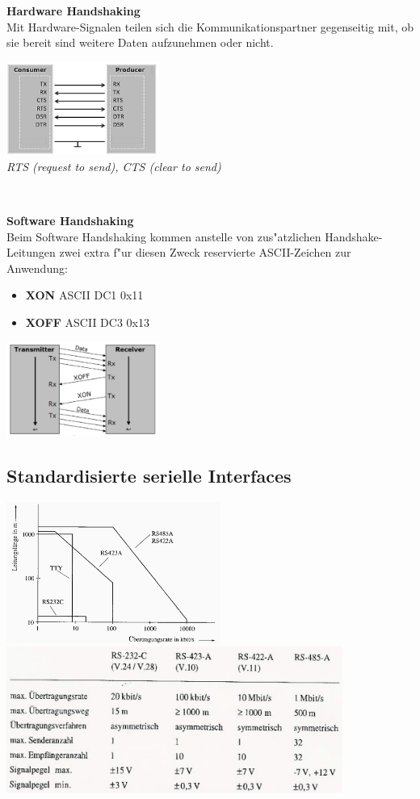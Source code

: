 	\begin{minipage}[t]{9cm}
		\textbf{Hardware Handshaking}\\
		Mit Hardware-Signalen teilen sich die Kommunikationspartner gegenseitig mit, ob sie bereit sind weitere Daten aufzunehmen oder nicht.
		\begin{center}
			\includegraphics[width=5cm]{images/HW-handshake}\\
			\textit{RTS (request to send), CTS (clear to send)}
		\end{center}
	\end{minipage}	
	\begin{minipage}[t]{0.5cm}
		\-\
	\end{minipage}
	\begin{minipage}[t]{9cm}
		\textbf{Software Handshaking}\\
		Beim Software Handshaking kommen anstelle von zus"atzlichen Handshake-Leitungen zwei extra f"ur diesen Zweck reservierte ASCII-Zeichen zur Anwendung:
		\begin{itemize}
			\item \textbf{XON} ASCII DC1 0x11
			\item \textbf{XOFF} ASCII DC3 0x13
		\end{itemize}
		\begin{center}
			\includegraphics[width=5cm]{images/SW-handshake}
		\end{center}
	\end{minipage}
\subsection{Standardisierte serielle Interfaces}
\includegraphics[width=7cm]{images/uebertragungsraten_seriellen_schnittstellen}
\includegraphics[width=11cm]{images/uebersicht-serielle-schnittstellen}
